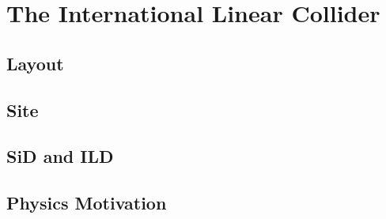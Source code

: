 \chapter{The International Linear Collider}
\label{ILC}
\section{Layout}
\label{ILC:layout}
\section{Site}
\label{ILC:site}
\section{SiD and ILD}
\label{ILC:detectors}
\section{Physics Motivation}
\label{ILC:physicsmotivation}
